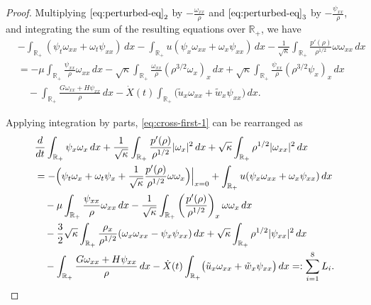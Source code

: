 \documentclass[11pt,reqno]{amsart}
\numberwithin{equation}{section} %
\begin{document}
\begin{proof}
	
	
Multiplying $\eqref{eq:perturbed-eq}_2$ by $-\frac{\omega_{xx}}{\rho}$ and $\eqref{eq:perturbed-eq}_3$ by $-\frac{\psi_{xx}}{\rho}$, and integrating the sum of the resulting equations over $\mathbb{R}_+$, we have
\begin{equation}\label{eq:cross-first-1}
\begin{aligned}
    &-\int_{\mathbb{R}_+} (\psi_t \omega_{xx} + \omega_t \psi_{xx}) \,dx - \int_{\mathbb{R}_+} u (\psi_x \omega_{xx} + \omega_x \psi_{xx}) \,dx - \frac{1}{\sqrt{\kappa}}\int_{\mathbb{R}_+} \frac{p'(\rho)}{\rho^{1/2}} \omega \omega_{xx} \,dx \\
    &= - \mu \int_{\mathbb{R}_+} \frac{\psi_{xx}}{\rho}  \omega_{xx} \,dx - \sqrt{\kappa} \int_{\mathbb{R}_+} \frac{\omega_{xx}}{\rho} (\rho^{3/2} \omega_x)_x \,dx + \sqrt{\kappa} \int_{\mathbb{R}_+} \frac{\psi_{xx}}{\rho} (\rho^{3/2} \psi_x)_x \,dx \\
    &\quad  -\int_{\mathbb{R}_+} \frac{G \omega_{xx}+H \psi_{xx}}{\rho}  \,dx - \dot{X}(t)\int_{\mathbb{R}_+} \bigl(  \tilde{u}_x \omega_{xx} + \tilde{w}_x \psi_{xx}\bigr) \,dx.
\end{aligned}
\end{equation}

Applying integration by parts, %
\eqref{eq:cross-first-1} can be rearranged as
\begin{equation*}%
\begin{aligned}
    &\frac{d}{dt} \int_{\mathbb{R}_+} \psi_x \omega_x \,dx + \frac{1}{\sqrt{\kappa}}\int_{\mathbb{R}_+} \frac{p'(\rho)}{\rho^{1/2}} |\omega_{x}|^2 \,dx +\sqrt{\kappa} \int_{\mathbb{R}_+}  \rho^{1/2} |\omega_{xx}|^2 \,dx \\
    &= -\Bigl(\psi_t \omega_x + \omega_t \psi_x + \frac{1}{\sqrt{\kappa}} \frac{p'(\rho)}{\rho^{1/2}} \omega \omega_x \Bigr) \Big|_{x=0} + \int_{\mathbb{R}_+} u (\psi_x \omega_{xx} + \omega_x \psi_{xx}) \,dx \\
    &\quad -\mu \int_{\mathbb{R}_+} \frac{\psi_{xx}}{\rho}  \omega_{xx} \,dx -\frac{1}{\sqrt{\kappa}} \int_{\mathbb{R}_+} \left( \frac{p'(\rho)}{\rho^{1/2}} \right)_x \omega \omega_x \,dx  \\
    &\quad - \frac{3}{2}\sqrt{\kappa} \int_{\mathbb{R}_+} \frac{\rho_x}{\rho^{1/2}} (\omega_x \omega_{xx} - \psi_x \psi_{xx}) \,dx + \sqrt{\kappa} \int_{\mathbb{R}_+} \rho^{1/2} |\psi_{xx}|^2 \,dx \\
    &\quad -\int_{\mathbb{R}_+} \frac{G \omega_{xx}+H \psi_{xx}}{\rho}  \,dx - \dot{X}(t)\int_{\mathbb{R}_+} \bigl(  \tilde{u}_x \omega_{xx} + \tilde{w}_x \psi_{xx}\bigr) \,dx =: \sum_{i=1}^8 L_i.
\end{aligned}
\end{equation*}


\end{proof}
\end{document}
